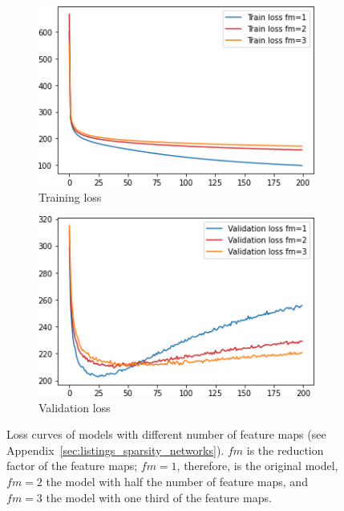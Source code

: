 \begin{figure}
    \centering
    \begin{subfigure}{.45\textwidth}
        \centering
        \includegraphics[width=\textwidth]{images/sparseness/sparseness_train_loss.png}
        \caption{Training loss}
    \end{subfigure}
    \hfill
    \begin{subfigure}{.45\textwidth}
        \centering
        \includegraphics[width=\textwidth]{images/sparseness/sparseness_validation_loss.png}
        \caption{Validation loss}
    \end{subfigure}
    \caption[Sparse Models - Loss Curves]{Loss curves of models with different number of feature maps (see Appendix~\ref{sec:listings_sparsity_networks}). $fm$ is the reduction factor of the feature maps; $fm=1$, therefore, is the original model, $fm=2$ the model with half the number of feature maps, and $fm=3$ the model with one third of the feature maps.}
    \label{fig:learning_curves_sparseness}
\end{figure}

